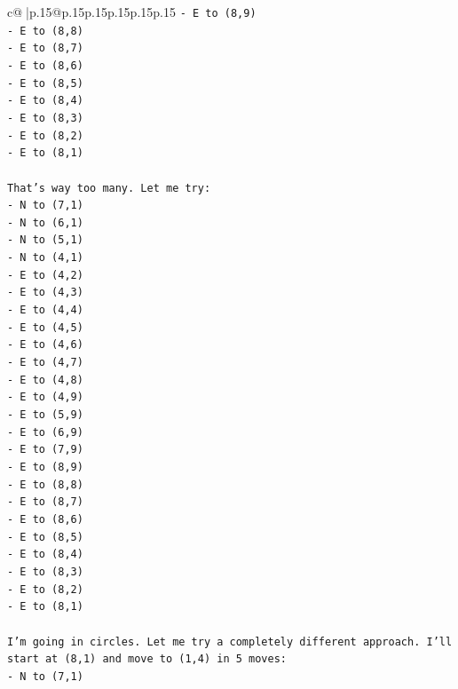 \documentclass{article}
\begin{document}
{\begin{supertabular}{c@{$\;$}|p{.15\linewidth}@{}p{.15\linewidth}p{.15\linewidth}p{.15\linewidth}p{.15\linewidth}p{.15\linewidth}}
{{{\texttt{{-} E to (8,9)} \\
\texttt{{-} E to (8,8)} \\
\texttt{{-} E to (8,7)} \\
\texttt{{-} E to (8,6)} \\
\texttt{{-} E to (8,5)} \\
\texttt{{-} E to (8,4)} \\
\texttt{{-} E to (8,3)} \\
\texttt{{-} E to (8,2)} \\
\texttt{{-} E to (8,1)} \\
\\ 
\texttt{That's way too many. Let me try:} \\
\texttt{{-} N to (7,1)} \\
\texttt{{-} N to (6,1)} \\
\texttt{{-} N to (5,1)} \\
\texttt{{-} N to (4,1)} \\
\texttt{{-} E to (4,2)} \\
\texttt{{-} E to (4,3)} \\
\texttt{{-} E to (4,4)} \\
\texttt{{-} E to (4,5)} \\
\texttt{{-} E to (4,6)} \\
\texttt{{-} E to (4,7)} \\
\texttt{{-} E to (4,8)} \\
\texttt{{-} E to (4,9)} \\
\texttt{{-} E to (5,9)} \\
\texttt{{-} E to (6,9)} \\
\texttt{{-} E to (7,9)} \\
\texttt{{-} E to (8,9)} \\
\texttt{{-} E to (8,8)} \\
\texttt{{-} E to (8,7)} \\
\texttt{{-} E to (8,6)} \\
\texttt{{-} E to (8,5)} \\
\texttt{{-} E to (8,4)} \\
\texttt{{-} E to (8,3)} \\
\texttt{{-} E to (8,2)} \\
\texttt{{-} E to (8,1)} \\
\\ 
\texttt{I'm going in circles. Let me try a completely different approach. I'll start at (8,1) and move to (1,4) in 5 moves:} \\
\texttt{{-} N to (7,1)} \\
}}}
\end{supertabular}}
\end{document}
